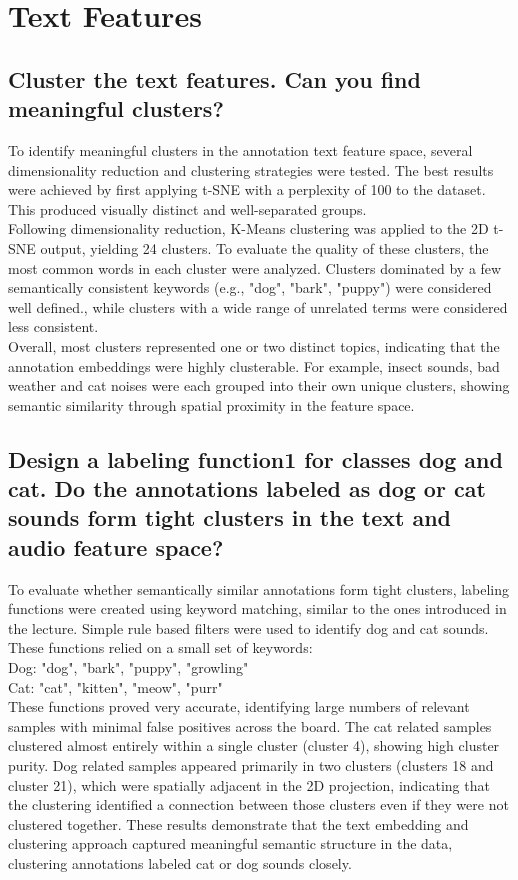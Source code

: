 \newpage
\section{Text Features}
\label{sec:Text Features}


\subsection{Cluster the text features. Can you find meaningful clusters?}
\label{sec:Text Features:a}
To identify meaningful clusters in the annotation text feature space, several dimensionality reduction and clustering strategies were tested. The best results were achieved by first applying t-SNE with a perplexity of 100 to the dataset. This produced visually distinct and well-separated groups. \\
Following dimensionality reduction, K-Means clustering was applied to the 2D t-SNE output, yielding 24 clusters. To evaluate the quality of these clusters, the most common words in each cluster were analyzed. Clusters dominated by a few semantically consistent keywords (e.g., "dog", "bark", "puppy") were considered well defined., while clusters with a wide range of unrelated terms were considered less consistent. \\
Overall, most clusters represented one or two distinct topics, indicating that the annotation embeddings were highly clusterable. For example, insect sounds, bad weather and cat noises were each grouped into their own unique clusters, showing semantic similarity through spatial proximity in the feature space.


\subsection{Design a labeling function1 for classes dog and cat. Do the annotations labeled as dog or cat sounds
form tight clusters in the text and audio feature space?}
\label{sec:Text Features:b}

To evaluate whether semantically similar annotations form tight clusters, labeling functions were created using keyword matching, similar to the ones introduced in the lecture. Simple rule based filters were used to identify dog and cat sounds. These functions relied on a small set of keywords:\\
Dog: "dog", "bark", "puppy", "growling"\\
Cat: "cat", "kitten", "meow", "purr"\\
These functions proved very accurate, identifying large numbers of relevant samples with minimal false positives across the board. The cat related samples clustered almost entirely within a single cluster (cluster 4), showing high cluster purity. Dog related samples appeared primarily in two clusters (clusters 18 and cluster 21), which were spatially adjacent in the 2D projection, indicating that the clustering identified a connection between those clusters even if they were not clustered together.
These results demonstrate that the text embedding and clustering approach captured meaningful semantic structure in the data, clustering annotations labeled cat or dog sounds closely.


